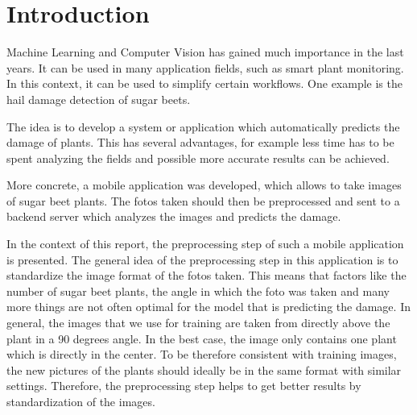 
\chapter{Introduction}

Machine Learning and Computer Vision has gained much importance in the last years. It can be used in many application fields, such as smart plant monitoring. In this context, it can be used to simplify certain workflows. One example is the hail damage detection of sugar beets. 

The idea is to develop a system or application which automatically predicts the damage of plants. This has several advantages, for example less time has to be spent analyzing the fields and possible more accurate results can be achieved. 

More concrete, a mobile application was developed, which allows to take images of sugar beet plants. The fotos taken should then be preprocessed and sent to a backend server which analyzes the images and predicts the damage. 

In the context of this report, the preprocessing step of such a mobile application is presented. The general idea of the preprocessing step in this application is to standardize the image format of the fotos taken. This means that factors like the number of sugar beet plants, the angle in which the foto was taken and many more things are not often optimal for the model that is predicting the damage. In general, the images that we use for training are taken from directly above the plant in a 90 degrees angle. In the best case, the image only contains one plant which is directly in the center. To be therefore consistent with training images, the new pictures of the plants should ideally be in the same format with similar settings. Therefore, the preprocessing step helps to get better results by standardization of the images. 

